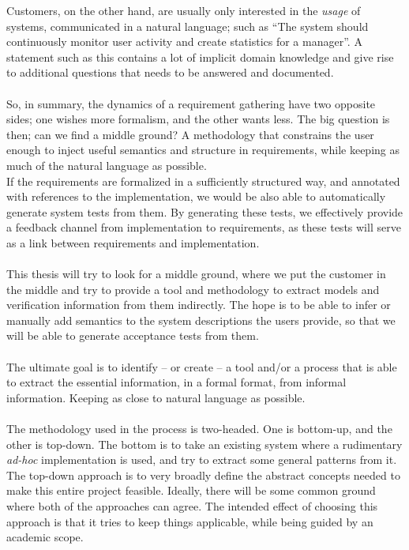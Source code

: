 Customers, on the other hand, are usually only interested in the \emph{usage} of systems, communicated in a natural language; such as ``The system should continuously monitor user activity and create statistics for a manager''. A statement such as this contains a lot of implicit domain knowledge and give rise to additional questions that needs to be answered and documented.\\\\
So, in summary, the dynamics of a requirement gathering have two opposite sides; one wishes more formalism, and the other wants less. The big question is then; can we find a middle ground? A methodology that constrains the user enough to inject useful semantics and structure in requirements, while keeping as much of the natural language as possible.\\
If the requirements are formalized in a sufficiently structured way, and annotated with references to the implementation, we would be also able to automatically generate system tests from them. By generating these tests, we effectively provide a feedback channel from implementation to requirements, as these tests will serve as a link between requirements and implementation.\\\\
This thesis will try to look for a middle ground, where we put the customer in the middle and try to provide a tool and methodology to extract models and verification information from them indirectly. The hope is to be able to infer or manually add semantics to the system descriptions the users provide, so that we will be able to generate acceptance tests from them.\\\\
The ultimate goal is to identify -- or create --  a tool and/or a process that is able to extract the essential information, in a formal format, from informal information. Keeping as close to natural language as possible.\\\\
The methodology used in the process is two-headed. One is bottom-up, and the other is top-down. The bottom is to take an existing system where a rudimentary \emph{ad-hoc} implementation is used, and try to extract some general patterns from it. The top-down approach is to very broadly define the abstract concepts needed to make this entire project feasible. Ideally, there will be some common ground where both of the approaches can agree. The intended effect of choosing this approach is that it tries to keep things applicable, while being guided by an academic scope.

